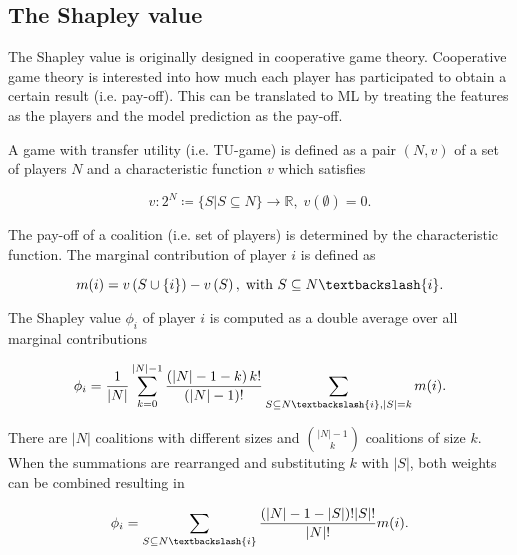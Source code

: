 \documentclass[twoside,twocolumn,9pt]{article}
\begin{document}
\subsection{The Shapley value}

The Shapley value is originally designed in cooperative game theory.\cite{shapley1953value} Cooperative
game theory is interested into how much each player has participated to obtain a certain
result (i.e. pay-off).\cite{branzei2008models} This can be translated to ML by treating the features 
as the players and the model prediction as the pay-off.\cite{merrick2020explanation}

A game with transfer utility (i.e. TU-game) is defined as a pair $\left(N, v\right)$ of a set
of players $N$ and a characteristic function $v$ which satisfies\cite{branzei2008models}

\begin{equation}
	v: 2^N \coloneqq \{S | S \subseteq N\} \rightarrow \mathbb{R}, \; v\left(\emptyset\right) = 0.
\end{equation}

The pay-off of a coalition (i.e. set of players) is determined by the characteristic
function. The marginal contribution of player $i$ is defined as\cite{zhang2022gstarx}

\begin{equation}
	m(i) = v\left(S \cup \{i\}\right) - v\left(S\right), \; \text{with } S \subseteq N \textbackslash \{i\}.
\end{equation}

The Shapley value $\phi_i$ of player $i$ is computed as a double average over all marginal contributions\cite{zhang2022gstarx}

\begin{equation}
	\label{eq:Shapley}
        \phi_i  = \frac{1}{|N|} \sum_{k=0}^{|N|-1} \frac{\left(|N| - 1 - k\right)k!}{\left(|N| - 1\right)!} \sum_{S \subseteq N \textbackslash \{i\}, |S| = k} m(i). 
\end{equation}

There are $|N|$ coalitions with different sizes and ${|N| - 1 \choose k}$ coalitions of size $k$.
When the summations are rearranged and substituting $k$ with $|S|$, both weights can be combined 
resulting in 

\begin{equation}
	\phi_i = \sum_{S \subseteq N \textbackslash \{i\}} \frac{\left(|N| - 1 - |S| \right)!|S|!}{|N|!} m(i).
\end{equation}
\end{document}
